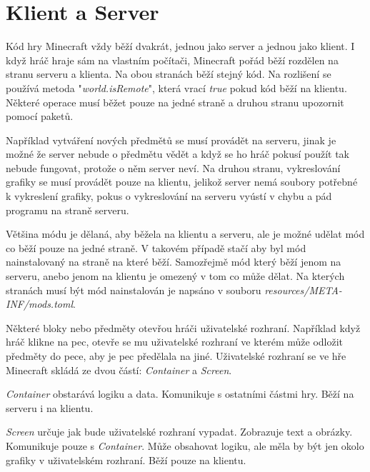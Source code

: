 \documentclass[FM,Proj,bw]{tulthesis}
\begin{document}
\section{Klient a Server}
Kód hry Minecraft  vždy běží dvakrát, jednou jako server a jednou jako klient. I když hráč hraje sám na vlastním počítači, Minecraft pořád běží rozdělen na stranu serveru a klienta. Na obou stranách běží stejný kód. Na rozlišení se používá metoda "\textit{world.isRemote}", která vrací \textit{true} pokud kód běží na klientu. Některé operace musí běžet pouze na jedné straně a druhou stranu upozornit pomocí paketů.
\par Například vytváření nových předmětů se musí provádět na serveru, jinak je možné že server nebude o předmětu vědět a když se ho hráč pokusí použít tak nebude fungovat, protože o něm server neví. Na druhou stranu, vykreslování grafiky se musí provádět pouze na klientu, jelikož server nemá soubory potřebné k vykreslení grafiky, pokus o vykreslování na serveru vyústí v chybu a pád programu na straně serveru. 
\par Většina módu je dělaná, aby běžela na klientu a serveru, ale je možné udělat mód co běží pouze na jedné straně. V takovém případě stačí aby byl mód nainstalovaný na straně na které běží. Samozřejmě mód který běží jenom na serveru, anebo jenom na klientu je omezený v tom co může dělat. Na kterých stranách musí být mód nainstalován je napsáno v souboru \textit{resources/META-INF/mods.toml}.
\par Některé bloky nebo předměty otevřou hráči uživatelské rozhraní. Například když hráč klikne na pec, otevře se mu uživatelské rozhraní ve kterém může odložit předměty do pece, aby je pec předělala na jiné. Uživatelské rozhraní se ve hře Minecraft skládá ze dvou částí: \textit{Container} a \textit{Screen}.
\par \textit{Container} obstarává logiku a data. Komunikuje s ostatními částmi hry. Běží na serveru i na  klientu.
\par \textit{Screen} určuje jak bude uživatelské rozhraní vypadat. Zobrazuje text a obrázky. Komunikuje pouze s \textit{Container}. Může obsahovat logiku, ale měla by být jen okolo grafiky v uživatelském rozhraní. Běží pouze na klientu.\cite{Forge}
\end{document}
